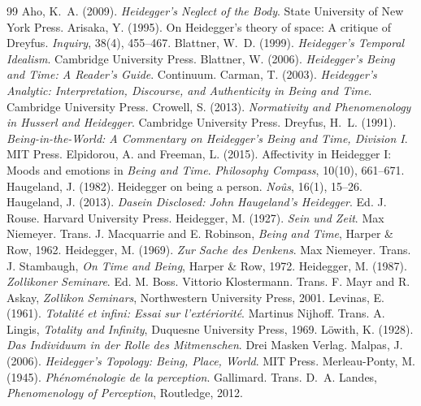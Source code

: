 \documentclass{situationist-preprint}
\begin{document}
\begin{thebibliography}{99}\small
{} Aho, K.~A. (2009). \emph{Heidegger's Neglect of the Body}. State University of New York Press.
 Arisaka, Y. (1995). On Heidegger's theory of space: A critique of Dreyfus. \emph{Inquiry}, 38(4), 455--467.
 Blattner, W.~D. (1999). \emph{Heidegger's Temporal Idealism}. Cambridge University Press.
 Blattner, W. (2006). \emph{Heidegger's Being and Time: A Reader's Guide}. Continuum.
 Carman, T. (2003). \emph{Heidegger's Analytic: Interpretation, Discourse, and Authenticity in Being and Time}. Cambridge University Press.
 Crowell, S. (2013). \emph{Normativity and Phenomenology in Husserl and Heidegger}. Cambridge University Press.
 Dreyfus, H.~L. (1991). \emph{Being-in-the-World: A Commentary on Heidegger's Being and Time, Division I}. MIT Press.
 Elpidorou, A. and Freeman, L. (2015). Affectivity in Heidegger I: Moods and emotions in \emph{Being and Time}. \emph{Philosophy Compass}, 10(10), 661--671.
 Haugeland, J. (1982). Heidegger on being a person. \emph{No\^us}, 16(1), 15--26.
 Haugeland, J. (2013). \emph{Dasein Disclosed: John Haugeland's Heidegger}. Ed. J. Rouse. Harvard University Press.
 Heidegger, M. (1927). \emph{Sein und Zeit}. Max Niemeyer. Trans. J. Macquarrie and E. Robinson, \emph{Being and Time}, Harper \& Row, 1962.
 Heidegger, M. (1969). \emph{Zur Sache des Denkens}. Max Niemeyer. Trans. J. Stambaugh, \emph{On Time and Being}, Harper \& Row, 1972.
 Heidegger, M. (1987). \emph{Zollikoner Seminare}. Ed. M. Boss. Vittorio Klostermann. Trans. F. Mayr and R. Askay, \emph{Zollikon Seminars}, Northwestern University Press, 2001.
 Levinas, E. (1961). \emph{Totalit\'e et infini: Essai sur l'ext\'eriorit\'e}. Martinus Nijhoff. Trans. A. Lingis, \emph{Totality and Infinity}, Duquesne University Press, 1969.
 L\"owith, K. (1928). \emph{Das Individuum in der Rolle des Mitmenschen}. Drei Masken Verlag.
 Malpas, J. (2006). \emph{Heidegger's Topology: Being, Place, World}. MIT Press.
 Merleau-Ponty, M. (1945). \emph{Ph\'enom\'enologie de la perception}. Gallimard. Trans. D.~A. Landes, \emph{Phenomenology of Perception}, Routledge, 2012.

\end{thebibliography}
\end{document}
